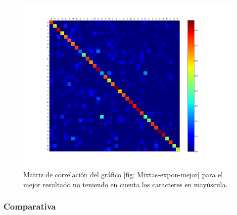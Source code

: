 			\begin{figure}[htbp]
				\centerline{\includegraphics[scale=0.4]{img/resultados/mixtas/best_expon_matrix_Alpha0,1_4080-4_ins.png}}
				\caption[Matriz de correlación ``case insensitive'' para mixtas expon]{Matriz de correlación del gráfico \ref{fig: Mixtas-expon-mejor} para el mejor resultado no teniendo en cuenta los caracteres en mayúscula.}
				\label{fig: MatrizIns-Mixtas-expon}
			\end{figure}
	
    	\subsubsection{Comparativa}

    	
